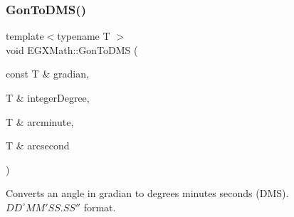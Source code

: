 \subsubsection{\texorpdfstring{Gon\+To\+D\+M\+S()}{GonToDMS()}}
{\footnotesize\ttfamily template$<$typename T $>$ \\
void E\+G\+X\+Math\+::\+Gon\+To\+D\+MS (\begin{DoxyParamCaption}\item[{const T \&}]{gradian,  }\item[{T \&}]{integer\+Degree,  }\item[{T \&}]{arcminute,  }\item[{T \&}]{arcsecond }\end{DoxyParamCaption})}



Converts an angle in gradian to degrees minutes seconds (D\+MS). ${DD}^{\circ}{MM}'{SS.SS}''$ format. 


